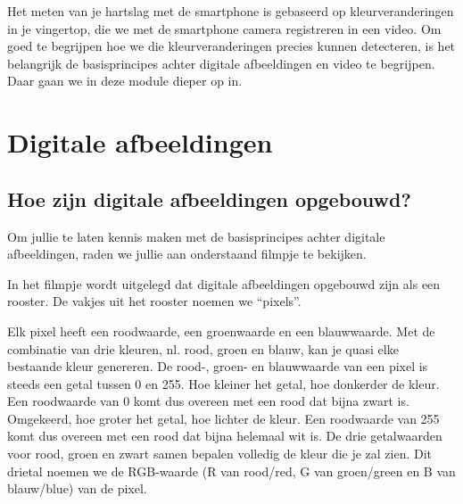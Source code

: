 
\begin{samenvatting}
Het meten van je hartslag met de smartphone is gebaseerd op kleurveranderingen in je vingertop, die we met de smartphone camera registreren in een video. Om goed te begrijpen hoe we die kleurveranderingen precies kunnen detecteren, is het belangrijk de basisprincipes achter digitale afbeeldingen en video te begrijpen. Daar gaan we in deze module dieper op in.
\end{samenvatting}
%

\section{Digitale afbeeldingen}
\label{sec:Mod3_Sec1}
%

\subsection{Hoe zijn digitale afbeeldingen opgebouwd?}

Om jullie te laten kennis maken met de basisprincipes achter digitale afbeeldingen, raden we jullie aan onderstaand filmpje te bekijken.


In het filmpje wordt uitgelegd dat digitale afbeeldingen opgebouwd zijn als een rooster. De vakjes uit het rooster noemen we \textquotedblleft pixels\textquotedblright. 

Elk pixel heeft een roodwaarde, een groenwaarde en een blauwwaarde. Met de combinatie van drie kleuren, nl. rood, groen en blauw, kan je quasi elke bestaande kleur genereren. De rood-, groen- en blauwwaarde van een pixel is steeds een getal tussen 0 en 255. Hoe kleiner het getal, hoe donkerder de kleur. Een roodwaarde van 0 komt dus overeen met een rood dat bijna zwart is. Omgekeerd, hoe groter het getal, hoe lichter de kleur. Een roodwaarde van 255 komt dus overeen met een rood dat bijna helemaal wit is. De drie getalwaarden voor rood, groen en zwart samen bepalen volledig de kleur die je zal zien. Dit drietal noemen we de RGB-waarde (R van rood/red, G van groen/green en B van blauw/blue) van de pixel.

